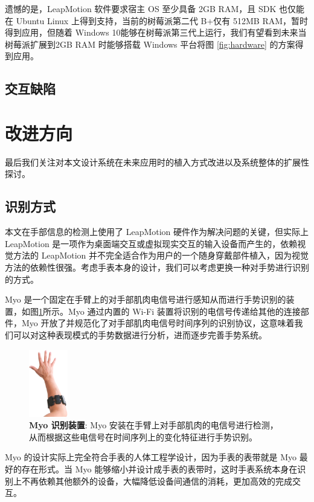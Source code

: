 遗憾的是，LeapMotion 软件要求宿主 OS 至少具备 2GB RAM，且 SDK 也仅能在 Ubuntu Linux 上得到支持，当前的树莓派第二代 B+仅有 512MB RAM，暂时得到应用，但随着 Windows 10能够在树莓派第三代上运行，我们有望看到未来当树莓派扩展到2GB RAM 时能够搭载 Windows 平台将图 \ref{fig:hardware} 的方案得到应用。

\subsection{交互缺陷}

\section{改进方向}

最后我们关注对本文设计系统在未来应用时的植入方式改进以及系统整体的扩展性探讨。

\subsection{识别方式}

本文在手部信息的检测上使用了 LeapMotion 硬件作为解决问题的关键，但实际上 LeapMotion 是一项作为桌面端交互或虚拟现实交互的输入设备而产生的，依赖视觉方法的 LeapMotion 并不完全适合作为用户的一个随身穿戴部件植入，因为视觉方法的依赖性很强。考虑手表本身的设计，我们可以考虑更换一种对手势进行识别的方式。

Myo \cite{Myo:2016} 是一个固定在手臂上的对手部肌肉电信号进行感知从而进行手势识别的装置，如图\ref{fig:myo}所示。Myo 通过内置的 Wi-Fi 装置将识别的电信号传递给其他的连接部件，Myo 开放了并规范化了对手部肌肉电信号时间序列的识别协议，这意味着我们可以对这种表现模式的手势数据进行分析，进而逐步完善手势系统。

\begin{figure}[H]
    \centering
    \includegraphics[width=0.15\textwidth]{figures/myo}
    \caption{\kaishu \textbf{Myo 识别装置}: Myo 安装在手臂上对手部肌肉的电信号进行检测，从而根据这些电信号在时间序列上的变化特征进行手势识别。}
    \label{fig:myo}
\end{figure}

Myo 的设计实际上完全符合手表的人体工程学设计，因为手表的表带就是 Myo 最好的存在形式。当 Myo 能够缩小并设计成手表的表带时，这时手表系统本身在识别上不再依赖其他额外的设备，大幅降低设备间通信的消耗，更加高效的完成交互。

